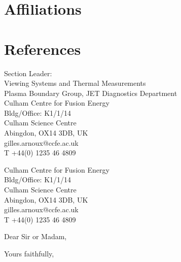 \documentclass[11pt,a4paper,sans]{moderncv}        %
\begin{document}
\section{Affiliations}
{}{}{}{}{}
{}{}{}{}{}

\section{References}
\begin{cvcolumns}
  {
Section Leader: \\Viewing Systems and Thermal Measurements \\
Plasma Boundary Group, JET Diagnostics Department \\
Culham Centre for Fusion Energy \\
Bldg/Office: K1/1/14 \\
Culham Science Centre \\
Abingdon, OX14 3DB, UK \\
gilles.arnoux@ccfe.ac.uk \\
T +44(0) 1235 46 4809}
\end{cvcolumns}
\begin{cvcolumns}
  \cvcolumn{}{}
  {
Culham Centre for Fusion Energy \\
Bldg/Office: K1/1/14 \\
Culham Science Centre \\
Abingdon, OX14 3DB, UK \\
gilles.arnoux@ccfe.ac.uk \\
T +44(0) 1235 46 4809}
\end{cvcolumns}

\clearpage
\date{\today}
\opening{Dear Sir or Madam,}
\closing{Yours faithfully,}
\makelettertitle
\end{document}
